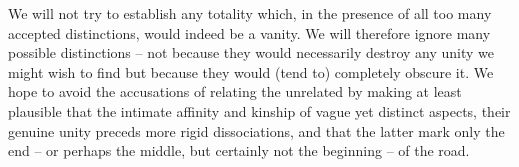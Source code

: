 We will not try to establish any totality which, in the presence of all too many
accepted distinctions, would indeed be a vanity. We will therefore ignore many possible
distinctions -- not because they would necessarily destroy any unity we might
wish to find but because they would (tend to) completely obscure it. 
We hope to avoid the accusations of relating the unrelated by
making at least plausible that the intimate affinity and kinship of vague yet
distinct aspects, their genuine unity preceds more rigid dissociations, and that
the latter mark only the end -- or perhaps the middle, but certainly not the
beginning -- of the road.
%
%




